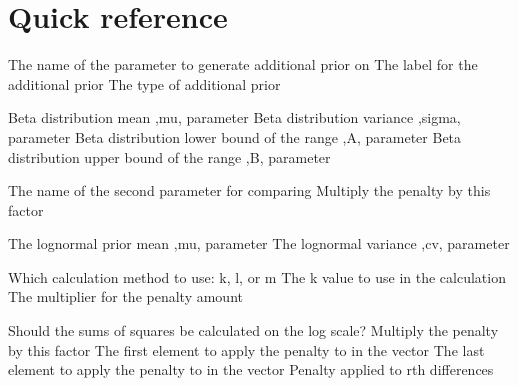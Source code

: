 \section{Quick reference\label{sec:quick-reference}}
\par
{} {The name of the parameter to generate additional prior on}
 {The label for the additional prior}
 {The type of additional prior}
\par\textbf{}\par
{} {Beta distribution mean ,mu, parameter}
 {Beta distribution variance ,sigma, parameter}
 {Beta distribution lower bound of the range ,A, parameter}
 {Beta distribution upper bound of the range ,B, parameter}
\par\textbf{}\par
{} {The name of the second parameter for comparing}
 {Multiply the penalty by this factor}
\par\textbf{}\par
{} {The lognormal prior mean ,mu, parameter}
 {The lognormal variance ,cv, parameter}
\par\textbf{}\par
\par\textbf{}\par
{} {Which calculation method to use: k, l, or m}
 {The k value to use in the calculation}
 {The multiplier for the penalty amount}
\par\textbf{}\par
{} {Should the sums of squares be calculated on the log scale?}
 {Multiply the penalty by this factor}
 {The first element to apply the penalty to in the vector}
 {The last element to apply the penalty to in the vector}
 {Penalty applied to rth differences}
\par\par
